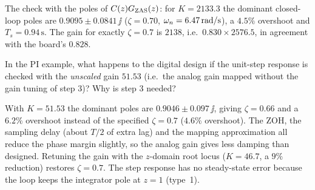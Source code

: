 \begin{remark}
The check with the poles of $C(z)G_{\mathrm{ZAS}}(z)$: for $K=2133.3$ the dominant closed-loop poles are $0.9095\pm0.0841\,\jj$ ($\zeta=0.70$,
$\omega_n=6.47\,\mathrm{rad/s}$), a $4.5\%$ overshoot and $T_s=0.94\,\mathrm{s}$. The gain for exactly $\zeta=0.7$ is $2138$, i.e.\ $0.830\times2576.5$, in
agreement with the board's $0.828$.
\end{remark}

\begin{problem}
In the PI example, what happens to the digital design if the unit-step response is checked with the \emph{unscaled} gain $51.53$
(i.e.\ the analog gain mapped without the gain tuning of step 3)? Why is step 3 needed?
\end{problem}
\begin{solution}
With $K=51.53$ the dominant poles are $0.9046\pm0.097\,\jj$, giving $\zeta=0.66$ and a $6.2\%$ overshoot instead of the specified
$\zeta=0.7$ ($4.6\%$ overshoot). The ZOH, the sampling delay (about $T/2$ of extra lag) and the mapping approximation all reduce the
phase margin slightly, so the analog gain gives less damping than designed. Retuning the gain with the $z$-domain root locus ($K=46.7$,
a $9\%$ reduction) restores $\zeta=0.7$. The step response has no steady-state error because the loop keeps the integrator pole at
$z=1$ (type~1).
\end{solution}
